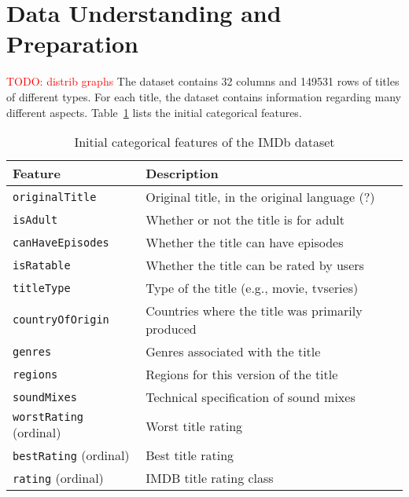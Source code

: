 \section{Data Understanding and Preparation}
\textcolor{red}{TODO: distrib graphs}
The dataset contains 32 columns and 149531 rows of titles of different types.
For each title, the dataset contains information regarding many different
aspects. Table~\ref{tab:initial_categorical_features} lists the initial categorical
features.
\begin{table}[H]
    \centering
    \begin{tabular}{|p{4cm}|p{9cm}|}

        \hline
        \textbf{Feature} & \textbf{Description} \\ \hline
        \texttt{originalTitle} & Original title, in the original language (?) \\ \hline
        \texttt{isAdult} & Whether or not the title is for adult \\ \hline
        \texttt{canHaveEpisodes} & Whether the title can have episodes \\ \hline
        \texttt{isRatable} & Whether the title can be rated by users \\ \hline
        \texttt{titleType} & Type of the title (e.g., movie, tvseries) \\ \hline
        \texttt{countryOfOrigin} & Countries where the title was primarily produced \\ \hline
        \texttt{genres} & Genres associated with the title \\ \hline
        \texttt{regions} & Regions for this version of the title \\ \hline
        \texttt{soundMixes} & Technical specification of sound mixes \\ \hline
        \texttt{worstRating} (ordinal) & Worst title rating \\ \hline
        \texttt{bestRating} (ordinal) & Best title rating \\ \hline
        \texttt{rating} (ordinal) & IMDB title rating class \\ \hline
    \end{tabular}
    \caption{Initial categorical features of the IMDb dataset}
    \label{tab:initial_categorical_features}
\end{table}


